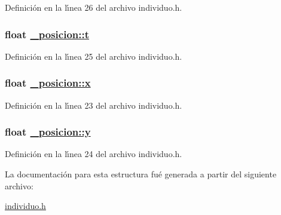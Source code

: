 Definici\'{o}n en la l\'{\i}nea 26 del archivo individuo.h.\hypertarget{struct__posicion_f0ba9aedeb816d241a108033f8421536_f0ba9aedeb816d241a108033f8421536}{
\subsubsection[t]{\setlength{\rightskip}{0pt plus 5cm}float \hyperlink{struct__posicion_f0ba9aedeb816d241a108033f8421536_f0ba9aedeb816d241a108033f8421536}{\_\-posicion::t}}}
\label{struct__posicion_f0ba9aedeb816d241a108033f8421536_f0ba9aedeb816d241a108033f8421536}




Definici\'{o}n en la l\'{\i}nea 25 del archivo individuo.h.\hypertarget{struct__posicion_71ad085b0f981b64ff6c9736979cf4d0_71ad085b0f981b64ff6c9736979cf4d0}{
\subsubsection[x]{\setlength{\rightskip}{0pt plus 5cm}float \hyperlink{struct__posicion_71ad085b0f981b64ff6c9736979cf4d0_71ad085b0f981b64ff6c9736979cf4d0}{\_\-posicion::x}}}
\label{struct__posicion_71ad085b0f981b64ff6c9736979cf4d0_71ad085b0f981b64ff6c9736979cf4d0}




Definici\'{o}n en la l\'{\i}nea 23 del archivo individuo.h.\hypertarget{struct__posicion_82d516a3aa89949f81676cc9bb3bdcab_82d516a3aa89949f81676cc9bb3bdcab}{
\subsubsection[y]{\setlength{\rightskip}{0pt plus 5cm}float \hyperlink{struct__posicion_82d516a3aa89949f81676cc9bb3bdcab_82d516a3aa89949f81676cc9bb3bdcab}{\_\-posicion::y}}}
\label{struct__posicion_82d516a3aa89949f81676cc9bb3bdcab_82d516a3aa89949f81676cc9bb3bdcab}




Definici\'{o}n en la l\'{\i}nea 24 del archivo individuo.h.

La documentaci\'{o}n para esta estructura fu\'{e} generada a partir del siguiente archivo:\begin{CompactItemize}
\item 
\hyperlink{individuo_8h}{individuo.h}\end{CompactItemize}
